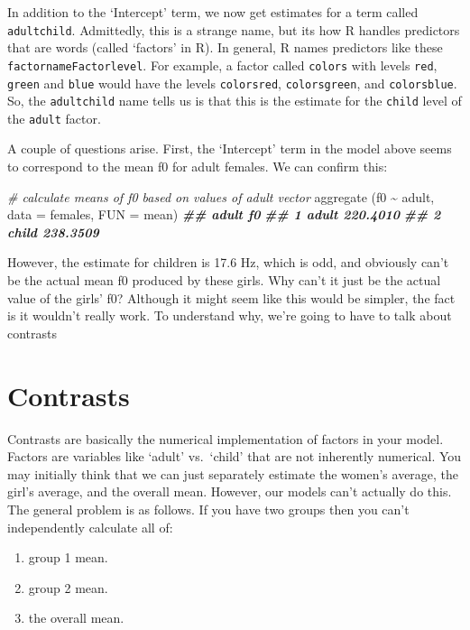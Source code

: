 \documentclass[
]{book}
\newenvironment{Shaded}{\begin{snugshade}}{\end{snugshade}}
\newcommand{\AttributeTok}[1]{\textcolor[rgb]{0.77,0.63,0.00}{#1}}
\newcommand{\CommentTok}[1]{\textcolor[rgb]{0.56,0.35,0.01}{\textit{#1}}}
\newcommand{\DocumentationTok}[1]{\textcolor[rgb]{0.56,0.35,0.01}{\textbf{\textit{#1}}}}
\newcommand{\FunctionTok}[1]{\textcolor[rgb]{0.00,0.00,0.00}{#1}}
\newcommand{\NormalTok}[1]{#1}
\newcommand{\SpecialCharTok}[1]{\textcolor[rgb]{0.00,0.00,0.00}{#1}}
\providecommand{\tightlist}{%
  \setlength{\itemsep}{0pt}\setlength{\parskip}{0pt}}
\begin{document}
In addition to the `Intercept' term, we now get estimates for a term called \texttt{adultchild}. Admittedly, this is a strange name, but its how R handles predictors that are words (called `factors' in R). In general, R names predictors like these \texttt{factornameFactorlevel}. For example, a factor called \texttt{colors} with levels \texttt{red}, \texttt{green} and \texttt{blue} would have the levels \texttt{colorsred}, \texttt{colorsgreen}, and \texttt{colorsblue}. So, the \texttt{adultchild} name tells us is that this is the estimate for the \texttt{child} level of the \texttt{adult} factor.

A couple of questions arise. First, the `Intercept' term in the model above seems to correspond to the mean f0 for adult females. We can confirm this:

\begin{Shaded}
\begin{Highlighting}[]
\CommentTok{\# calculate means of f0 based on values of adult vector}
\FunctionTok{aggregate}\NormalTok{ (f0 }\SpecialCharTok{\textasciitilde{}}\NormalTok{ adult, }\AttributeTok{data =}\NormalTok{ females, }\AttributeTok{FUN =}\NormalTok{ mean)}
\DocumentationTok{\#\#   adult       f0}
\DocumentationTok{\#\# 1 adult 220.4010}
\DocumentationTok{\#\# 2 child 238.3509}
\end{Highlighting}
\end{Shaded}

However, the estimate for children is 17.6 Hz, which is odd, and obviously can't be the actual mean f0 produced by these girls. Why can't it just be the actual value of the girls' f0? Although it might seem like this would be simpler, the fact is it wouldn't really work. To understand why, we're going to have to talk about contrasts

\hypertarget{contrasts}{%
\section{Contrasts}\label{contrasts}}

Contrasts are basically the numerical implementation of factors in your model. Factors are variables like `adult' vs.~`child' that are not inherently numerical. You may initially think that we can just separately estimate the women's average, the girl's average, and the overall mean. However, our models can't actually do this. The general problem is as follows. If you have two groups then you can't independently calculate all of:

\begin{enumerate}
\def\labelenumi{\arabic{enumi})}
\tightlist
\item
  group 1 mean.
\item
  group 2 mean.
\item
  the overall mean.
\end{enumerate}
\end{document}
